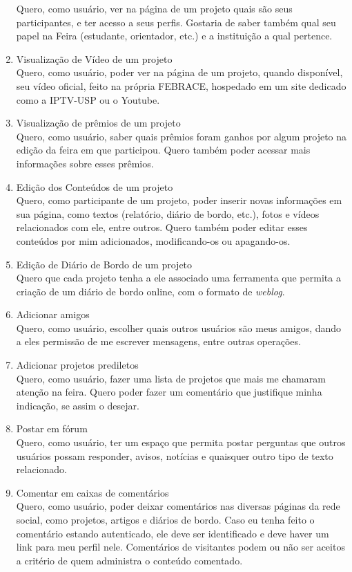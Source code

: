 \begin{enumerate}
        Quero, como usuário, ver na página de um projeto quais são seus participantes, e ter acesso a seus perfis. Gostaria de saber também qual seu papel na Feira (estudante, orientador, etc.) e a instituição a qual pertence.
      \item Visualização de Vídeo de um projeto \\
        Quero, como usuário, poder ver na página de um projeto, quando disponível, seu vídeo oficial, feito na própria FEBRACE, hospedado em um site dedicado como a IPTV-USP ou o Youtube.
      \item Visualização de prêmios de um projeto \\
        Quero, como usuário, saber quais prêmios foram ganhos por algum projeto na edição da feira em que participou. Quero também poder acessar mais informações sobre esses prêmios.
      \item Edição dos Conteúdos de um projeto \\
        Quero, como participante de um projeto, poder inserir novas informações em sua página, como textos (relatório, diário de bordo, etc.), fotos e vídeos relacionados com ele, entre outros. Quero também poder editar esses conteúdos por mim adicionados, modificando-os ou apagando-os.
      \item Edição de Diário de Bordo de um projeto \\
        Quero que cada projeto tenha a ele associado uma ferramenta que permita a criação de um diário de bordo online, com o formato de \textit{weblog}.
      \item Adicionar amigos \\
        Quero, como usuário, escolher quais outros usuários são meus amigos, dando a eles permissão de me escrever mensagens, entre outras operações.
      \item Adicionar projetos prediletos \\
        Quero, como usuário, fazer uma lista de projetos que mais me chamaram atenção na feira. Quero poder fazer um comentário que justifique minha indicação, se assim o desejar.
      \item Postar em fórum \\
        Quero, como usuário, ter um espaço que permita postar perguntas que outros usuários possam responder, avisos, notícias e quaisquer outro tipo de texto relacionado.
      \item Comentar em caixas de comentários \\
        Quero, como usuário, poder deixar comentários nas diversas páginas da rede social, como projetos, artigos e diários de bordo. Caso eu tenha feito o comentário estando autenticado, ele deve ser identificado e deve haver um link para meu perfil nele. Comentários de visitantes podem ou não ser aceitos a critério de quem administra o conteúdo comentado.

\end{enumerate}
